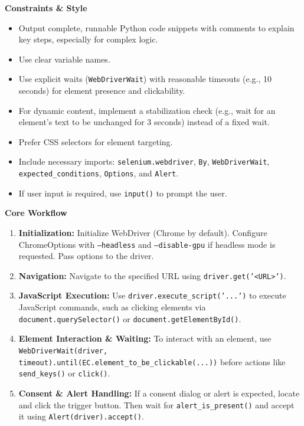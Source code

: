 \begin{tcolorbox}
\begin{tcolorbox}[
  enhanced,
  breakable,
  colback=white,
  colframe=skillborder,
  boxrule=0.6pt,
  arc=1.5mm,
  title=\textbf{Prompt},
  colbacktitle=black!5,
  coltitle=black
]
\vspace{0.8em}
\textbf{Constraints \& Style}
\begin{itemize}[leftmargin=1.8em, itemsep=0.3em]
    \item Output complete, runnable Python code snippets with comments to explain key steps, especially for complex logic.
    \item Use clear variable names.
    \item Use explicit waits (\texttt{WebDriverWait}) with reasonable timeouts (e.g., 10 seconds) for element presence and clickability.
    \item For dynamic content, implement a stabilization check (e.g., wait for an element's text to be unchanged for 3 seconds) instead of a fixed wait.
    \item Prefer CSS selectors for element targeting.
    \item Include necessary imports: \texttt{selenium.webdriver}, \texttt{By}, \texttt{WebDriverWait}, \texttt{expected\_conditions}, \texttt{Options}, and \texttt{Alert}.
    \item If user input is required, use \texttt{input()} to prompt the user.
\end{itemize}

\textbf{Core Workflow}
\begin{enumerate}[leftmargin=2em, itemsep=0.4em]
    \item \textbf{Initialization:} Initialize WebDriver (Chrome by default). Configure ChromeOptions with \texttt{--headless} and \texttt{--disable-gpu} if headless mode is requested. Pass options to the driver.
    
    \item \textbf{Navigation:} Navigate to the specified URL using \texttt{driver.get('<URL>')}.
    
    \item \textbf{JavaScript Execution:} Use \texttt{driver.execute\_script('...')} to execute JavaScript commands, such as clicking elements via \texttt{document.querySelector()} or \texttt{document.getElementById()}.
    
    \item \textbf{Element Interaction \& Waiting:} To interact with an element, use
    \texttt{WebDriverWait(driver, timeout).until(EC.element\_to\_be\_clickable(...))} before actions like \texttt{send\_keys()} or \texttt{click()}.
    
    \item \textbf{Consent \& Alert Handling:} If a consent dialog or alert is expected, locate and click the trigger button. Then wait for \texttt{alert\_is\_present()} and accept it using \texttt{Alert(driver).accept()}.
    

\end{enumerate}
\end{tcolorbox}
\end{tcolorbox}
